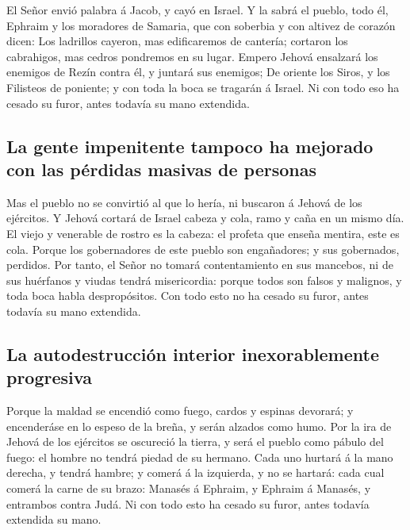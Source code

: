  El Señor envió palabra á Jacob, y cayó en Israel.
 Y la sabrá el pueblo, todo él, Ephraim y los moradores de
Samaria, que con soberbia y con altivez de corazón dicen: 
Los ladrillos cayeron, mas edificaremos de cantería; cortaron los
cabrahigos, mas cedros pondremos en su lugar.  Empero
Jehová ensalzará los enemigos de Rezín contra él, y juntará sus
enemigos;  De oriente los Siros, y los Filisteos de
poniente; y con toda la boca se tragarán á Israel. Ni con todo eso ha
cesado su furor, antes todavía su mano extendida.

\hypertarget{la-gente-impenitente-tampoco-ha-mejorado-con-las-puxe9rdidas-masivas-de-personas}{%
\subsection{La gente impenitente tampoco ha mejorado con las pérdidas
masivas de
personas}\label{la-gente-impenitente-tampoco-ha-mejorado-con-las-puxe9rdidas-masivas-de-personas}}

 Mas el pueblo no se convirtió al que lo hería, ni buscaron
á Jehová de los ejércitos.  Y Jehová cortará de Israel
cabeza y cola, ramo y caña en un mismo día.  El viejo y
venerable de rostro es la cabeza: el profeta que enseña mentira, este es
cola.  Porque los gobernadores de este pueblo son
engañadores; y sus gobernados, perdidos.  Por tanto, el
Señor no tomará contentamiento en sus mancebos, ni de sus huérfanos y
viudas tendrá misericordia: porque todos son falsos y malignos, y toda
boca habla despropósitos. Con todo esto no ha cesado su furor, antes
todavía su mano extendida.

\hypertarget{la-autodestrucciuxf3n-interior-inexorablemente-progresiva}{%
\subsection{La autodestrucción interior inexorablemente
progresiva}\label{la-autodestrucciuxf3n-interior-inexorablemente-progresiva}}

 Porque la maldad se encendió como fuego, cardos y espinas
devorará; y encenderáse en lo espeso de la breña, y serán alzados como
humo.  Por la ira de Jehová de los ejércitos se oscureció
la tierra, y será el pueblo como pábulo del fuego: el hombre no tendrá
piedad de su hermano.  Cada uno hurtará á la mano derecha,
y tendrá hambre; y comerá á la izquierda, y no se hartará: cada cual
comerá la carne de su brazo:  Manasés á Ephraim, y Ephraim
á Manasés, y entrambos contra Judá. Ni con todo esto ha cesado su furor,
antes todavía extendida su mano.

